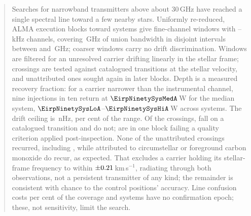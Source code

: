\begin{abstract}
Searches for narrowband transmitters above about 30\,GHz have reached a single
spectral line toward a few nearby stars. Uniformly re-reduced, \NEB{} ALMA execution blocks toward
\NSysClassA{} systems give \NWinA{} fine-channel windows with
\ChanLoA--\ChanHiA\,kHz channels, covering \CvUnionA\,GHz of union bandwidth
in \CovNIslands{} disjoint intervals between \SurvFreqLoA{} and
\SurvFreqHiA\,GHz; \NWinB{} coarser windows carry no drift discrimination.
Windows are filtered for an unresolved carrier drifting linearly in the
stellar frame; crossings are tested against catalogued transitions at the
stellar velocity, and unattributed ones sought again in later blocks. Depth
is a measured recovery fraction: for a carrier narrower than the instrumental
channel, nine injections in ten return at
$\EirpNinetySysMedA$\,W for the median system,
$\EirpNinetySysLoA$--$\EirpNinetySysHiA$\,W across systems. The drift ceiling
is \DriftCeilLo\,nHz, \AccelSheikhPct{} per cent of the \citet{Sheikh2019}
range. Of the \EvNCrossRaw{} crossings, \MkAttr{} fall on a catalogued
transition and \MkUnattr{} do not; \PrFlagXrossWord{} are in one
block failing a quality criterion applied post-inspection. None of the
unattributed crossings recurred, including \PrRankClause, while
\MkAttrRecur{} attributed to circumstellar or foreground carbon monoxide do
recur, as expected. That excludes a carrier holding its stellar-frame
frequency to within $\pm\RqDvMed$\,km\,s$^{-1}$, radiating through both
observations, not a persistent transmitter of any kind; the remainder is
consistent with chance to the control positions' accuracy. Line
confusion costs \MkMaskAPct{} per cent of the coverage and \ScSysNoConf{}
systems have no confirmation epoch; these, not sensitivity, limit the search.
\end{abstract}


